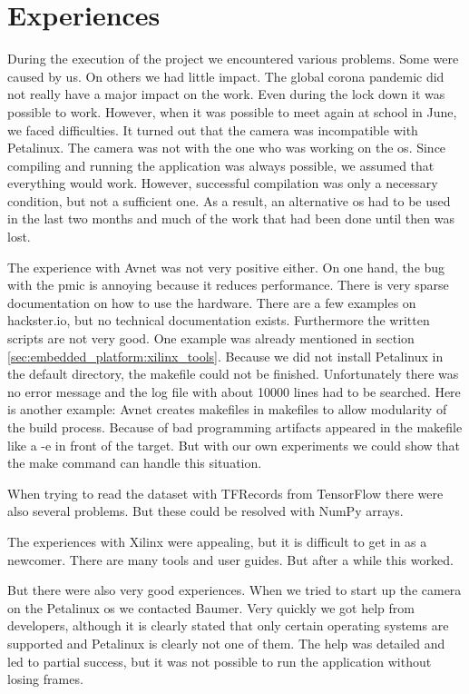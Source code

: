 \chapter*{Experiences}
\label{ch:experiences}

During the execution of the project we encountered various problems.
Some were caused by us.
On others we had little impact.
The global corona pandemic did not really have a major impact on the work.
Even during the lock down it was possible to work.
However, when it was possible to meet again at school in June, we faced difficulties.
It turned out that the camera was incompatible with Petalinux.
The camera was not with the one who was working on the \acrlong{os}.
Since compiling and running the application was always possible, we assumed that everything would work.
However, successful compilation was only a necessary condition, but not a sufficient one.
As a result, an alternative \acrlong{os} had to be used in the last two months and much of the work that had been done until then was lost. 

The experience with Avnet was not very positive either.
On one hand, the bug with the \acrshort{pmic} is annoying because it reduces performance.
There is very sparse documentation on how to use the hardware.
There are a few examples on hackster.io, but no technical documentation exists.
Furthermore the written scripts are not very good.
One example was already mentioned in section \ref{sec:embedded_platform:xilinx_tools}.
Because we did not install Petalinux in the default directory, the makefile could not be finished.
Unfortunately there was no error message and the log file with about \num{10000} lines had to be searched.
Here is another example:
Avnet creates makefiles in makefiles to allow modularity of the build process.
Because of bad programming artifacts appeared in the makefile like a -e in front of the target.
But with our own experiments we could show that the make command can handle this situation.

When trying to read the dataset with TFRecords from TensorFlow there were also several problems.
But these could be resolved with NumPy arrays.

The experiences with Xilinx were appealing, but it is difficult to get in as a newcomer.
There are many tools and user guides.
But after a while this worked.

But there were also very good experiences.
When we tried to start up the camera on the Petalinux \acrshort{os} we contacted Baumer.
Very quickly we got help from developers, although it is clearly stated that only certain operating systems are supported and Petalinux is clearly not one of them.
The help was detailed and led to partial success, but it was not possible to run the application without losing frames.

